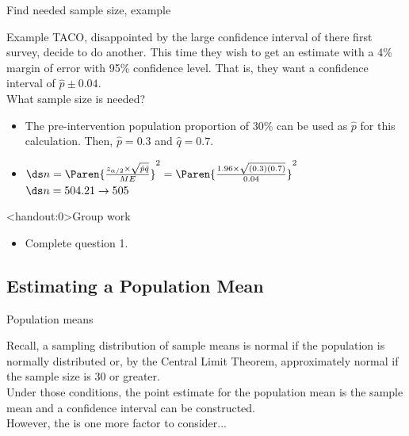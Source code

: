 \documentclass[xcolor=table, handout]{beamer}
\begin{document}
\begin{frame}{Find needed sample size, example}
\begin{exampleblock}{Example}
\large
TACO, disappointed by the large confidence interval of there first survey, decide to do another. This time they wish to get an estimate with a 4\% margin of error with 95\% confidence level. That is, they want a confidence interval of $\hat p \pm 0.04$.\\
\medskip
What sample size is needed?
\begin{itemize}
\pause\item The pre-intervention population proportion of 30\% can be used as $\hat p$ for this calculation. Then, $\hat p = 0.3$ and $\hat q = 0.7$.
\pause\item $\ds n = \Paren{\frac {z_{\alpha/2} \times \sqrt{\hat p \hat q}}{ME}}^2 = \Paren{\frac {1.96 \times \sqrt{(0.3) (0.7)}}{0.04}}^2$\\
\medskip
$\ds n = 504.21 \to 505$ 
\end{itemize}
\end{exampleblock}
\end{frame}

\begin{frame}<handout:0>{Group work}
\begin{block}{}
\large
\begin{itemize}
\item Complete question 1.
\end{itemize}
\end{block}
\end{frame}


\subsection{Estimating a Population Mean}

\begin{frame}{Population means}

\begin{block}{}
\large
Recall, a sampling distribution of sample means is normal if the population is normally distributed or, by the Central Limit Theorem, approximately normal if the sample size is 30 or greater.\\
\pause\medskip
Under those conditions, the point estimate for the population mean is the sample mean and a confidence interval can be constructed.\\
\pause\medskip
However, the is one more factor to consider...
\end{block}
\end{frame}
\end{document}

